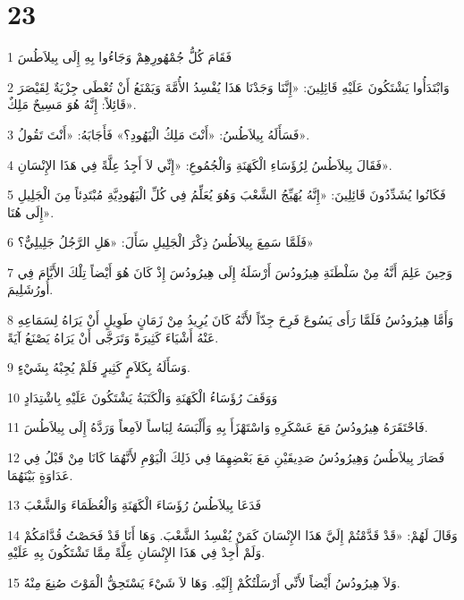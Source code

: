 \chapter{23}

\par 1 فَقَامَ كُلُّ جُمْهُورِهِمْ وَجَاءُوا بِهِ إِلَى بِيلاَطُسَ
\par 2 وَابْتَدَأُوا يَشْتَكُونَ عَلَيْهِ قَائِلِينَ: «إِنَّنَا وَجَدْنَا هَذَا يُفْسِدُ الأُمَّةَ وَيَمْنَعُ أَنْ تُعْطَى جِزْيَةٌ لِقَيْصَرَ قَائِلاً: إِنَّهُ هُوَ مَسِيحٌ مَلِكٌ».
\par 3 فَسَأَلَهُ بِيلاَطُسُ: «أَنْتَ مَلِكُ الْيَهُودِ؟» فَأَجَابَهُ: «أَنْتَ تَقُولُ».
\par 4 فَقَالَ بِيلاَطُسُ لِرُؤَسَاءِ الْكَهَنَةِ وَالْجُمُوعِ: «إِنِّي لاَ أَجِدُ عِلَّةً فِي هَذَا الإِنْسَانِ».
\par 5 فَكَانُوا يُشَدِّدُونَ قَائِلِينَ: «إِنَّهُ يُهَيِّجُ الشَّعْبَ وَهُوَ يُعَلِّمُ فِي كُلِّ الْيَهُودِيَّةِ مُبْتَدِئاً مِنَ الْجَلِيلِ إِلَى هُنَا».
\par 6 فَلَمَّا سَمِعَ بِيلاَطُسُ ذِكْرَ الْجَلِيلِ سَأَلَ: «هَلِ الرَّجُلُ جَلِيلِيٌّ؟»
\par 7 وَحِينَ عَلِمَ أَنَّهُ مِنْ سَلْطَنَةِ هِيرُودُسَ أَرْسَلَهُ إِلَى هِيرُودُسَ إِذْ كَانَ هُوَ أَيْضاً تِلْكَ الأَيَّامَ فِي أُورُشَلِيمَ.
\par 8 وَأَمَّا هِيرُودُسُ فَلَمَّا رَأَى يَسُوعَ فَرِحَ جِدّاً لأَنَّهُ كَانَ يُرِيدُ مِنْ زَمَانٍ طَوِيلٍ أَنْ يَرَاهُ لِسَمَاعِهِ عَنْهُ أَشْيَاءَ كَثِيرَةً وَتَرَجَّى أَنْ يَرَاهُ يَصْنَعُ آيَةً.
\par 9 وَسَأَلَهُ بِكَلاَمٍ كَثِيرٍ فَلَمْ يُجِبْهُ بِشَيْءٍ.
\par 10 وَوَقَفَ رُؤَسَاءُ الْكَهَنَةِ وَالْكَتَبَةُ يَشْتَكُونَ عَلَيْهِ بِاشْتِدَادٍ
\par 11 فَاحْتَقَرَهُ هِيرُودُسُ مَعَ عَسْكَرِهِ وَاسْتَهْزَأَ بِهِ وَأَلْبَسَهُ لِبَاساً لاَمِعاً وَرَدَّهُ إِلَى بِيلاَطُسَ.
\par 12 فَصَارَ بِيلاَطُسُ وَهِيرُودُسُ صَدِيقَيْنِ مَعَ بَعْضِهِمَا فِي ذَلِكَ الْيَوْمِ لأَنَّهُمَا كَانَا مِنْ قَبْلُ فِي عَدَاوَةٍ بَيْنَهُمَا.
\par 13 فَدَعَا بِيلاَطُسُ رُؤَسَاءَ الْكَهَنَةِ وَالْعُظَمَاءَ وَالشَّعْبَ
\par 14 وَقَالَ لَهُمْ: «قَدْ قَدَّمْتُمْ إِلَيَّ هَذَا الإِنْسَانَ كَمَنْ يُفْسِدُ الشَّعْبَ. وَهَا أَنَا قَدْ فَحَصْتُ قُدَّامَكُمْ وَلَمْ أَجِدْ فِي هَذَا الإِنْسَانِ عِلَّةً مِمَّا تَشْتَكُونَ بِهِ عَلَيْهِ.
\par 15 وَلاَ هِيرُودُسُ أَيْضاً لأَنِّي أَرْسَلْتُكُمْ إِلَيْهِ. وَهَا لاَ شَيْءَ يَسْتَحِقُّ الْمَوْتَ صُنِعَ مِنْهُ.
